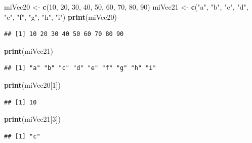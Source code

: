 \documentclass[
]{book}
\newenvironment{Shaded}{\begin{snugshade}}{\end{snugshade}}
\newcommand{\DecValTok}[1]{\textcolor[rgb]{0.00,0.00,0.81}{#1}}
\newcommand{\KeywordTok}[1]{\textcolor[rgb]{0.13,0.29,0.53}{\textbf{#1}}}
\newcommand{\NormalTok}[1]{#1}
\newcommand{\StringTok}[1]{\textcolor[rgb]{0.31,0.60,0.02}{#1}}
\begin{document}
\begin{Shaded}
\begin{Highlighting}[]
\NormalTok{miVec20 <-}\StringTok{ }\KeywordTok{c}\NormalTok{(}\DecValTok{10}\NormalTok{, }\DecValTok{20}\NormalTok{, }\DecValTok{30}\NormalTok{, }\DecValTok{40}\NormalTok{, }\DecValTok{50}\NormalTok{, }\DecValTok{60}\NormalTok{, }\DecValTok{70}\NormalTok{, }\DecValTok{80}\NormalTok{, }\DecValTok{90}\NormalTok{)}
\NormalTok{miVec21 <-}\StringTok{ }\KeywordTok{c}\NormalTok{(}\StringTok{"a"}\NormalTok{, }\StringTok{"b"}\NormalTok{, }\StringTok{"c"}\NormalTok{, }\StringTok{"d"}\NormalTok{, }\StringTok{"e"}\NormalTok{, }\StringTok{"f"}\NormalTok{, }\StringTok{"g"}\NormalTok{, }\StringTok{"h"}\NormalTok{, }\StringTok{"i"}\NormalTok{)}
\KeywordTok{print}\NormalTok{(miVec20)}
\end{Highlighting}
\end{Shaded}

\begin{verbatim}
## [1] 10 20 30 40 50 60 70 80 90
\end{verbatim}

\begin{Shaded}
\begin{Highlighting}[]
\KeywordTok{print}\NormalTok{(miVec21)}
\end{Highlighting}
\end{Shaded}

\begin{verbatim}
## [1] "a" "b" "c" "d" "e" "f" "g" "h" "i"
\end{verbatim}

\begin{Shaded}
\begin{Highlighting}[]
\KeywordTok{print}\NormalTok{(miVec20[}\DecValTok{1}\NormalTok{])}
\end{Highlighting}
\end{Shaded}

\begin{verbatim}
## [1] 10
\end{verbatim}

\begin{Shaded}
\begin{Highlighting}[]
\KeywordTok{print}\NormalTok{(miVec21[}\DecValTok{3}\NormalTok{])}
\end{Highlighting}
\end{Shaded}

\begin{verbatim}
## [1] "c"
\end{verbatim}
\end{document}
